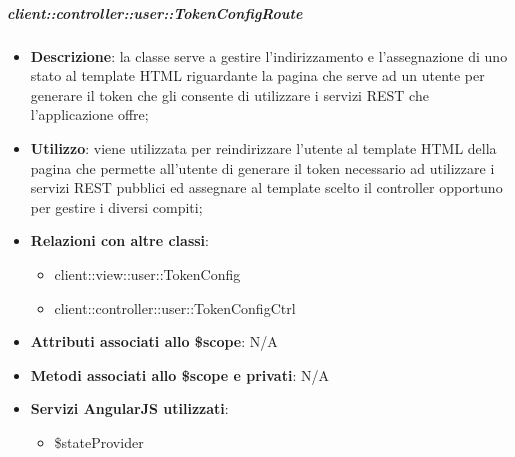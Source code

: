 		\subparagraph{client::controller::user::TokenConfigRoute} %
		\label{subp:bdsm_app_client_controller_user_tokenconfigroute}

			\begin{itemize}
				\item \textbf{Descrizione}: la classe serve a gestire l'indirizzamento e l'assegnazione di uno stato al template HTML riguardante la pagina che serve ad un utente per generare il token che gli consente di utilizzare i servizi REST che l'applicazione offre;
				\item \textbf{Utilizzo}: viene utilizzata per reindirizzare l'utente al template HTML della pagina che permette all'utente di generare il token necessario ad utilizzare i servizi REST pubblici ed assegnare al template scelto il controller opportuno per gestire i diversi compiti;
				\item \textbf{Relazioni con altre classi}:
					\begin{itemize}
						\item client::view::user::TokenConfig
						\item client::controller::user::TokenConfigCtrl
					\end{itemize}
				\item \textbf{Attributi associati allo \$scope}: N/A
				\item \textbf{Metodi associati allo \$scope e privati}: N/A
				\item \textbf{Servizi AngularJS utilizzati}:
					\begin{itemize}
						\item \$stateProvider
					\end{itemize}
			\end{itemize}

